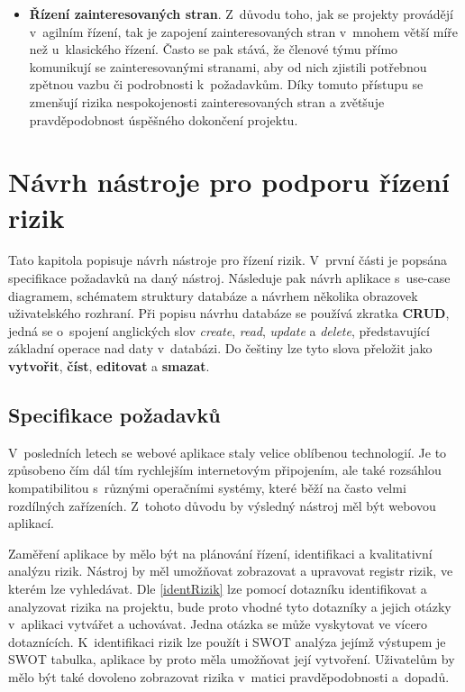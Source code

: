 \begin{itemize}
    \item \textbf{Řízení zainteresovaných stran}. Z~důvodu toho, jak se projekty provádějí v~agilním řízení, tak je zapojení zainteresovaných stran v~mnohem větší míře než u~klasického řízení. Často se pak stává, že členové týmu přímo komunikují se zainteresovanými stranami, aby od nich zjistili potřebnou zpětnou vazbu či podrobnosti k~požadavkům. Díky tomuto přístupu se zmenšují rizika nespokojenosti zainteresovaných stran a zvětšuje pravděpodobnost úspěšného dokončení projektu. 
\end{itemize}


\chapter{Návrh nástroje pro podporu řízení rizik}
\label{navrh}

Tato kapitola popisuje návrh nástroje pro řízení rizik. V~první části je popsána specifikace požadavků na daný nástroj. Následuje pak návrh aplikace s~use-case diagramem, schématem struktury databáze a návrhem několika obrazovek uživatelského rozhraní. Při popisu návrhu databáze se používá zkratka \textbf{CRUD}, jedná se o~spojení anglických slov \textit{create}, \textit{read}, \textit{update} a \textit{delete}, představující základní operace nad daty v~databázi. Do češtiny lze tyto slova přeložit jako \textbf{vytvořit}, \textbf{číst}, \textbf{editovat} a \textbf{smazat}.

\section{Specifikace požadavků}

V~posledních letech se webové aplikace staly velice oblíbenou technologií. Je to způsobeno čím dál tím rychlejším internetovým připojením, ale také rozsáhlou kompatibilitou s~různými operačními systémy, které běží na často velmi rozdílných zařízeních. Z~tohoto důvodu by výsledný nástroj měl být webovou aplikací. 

Zaměření aplikace by mělo být na plánování řízení, identifikaci a kvalitativní analýzu rizik. Nástroj by měl umožňovat zobrazovat a upravovat registr rizik, ve kterém lze vyhledávat. Dle \ref{identRizik} lze pomocí dotazníku identifikovat a analyzovat rizika na projektu, bude proto vhodné tyto dotazníky a jejich otázky v~aplikaci vytvářet a uchovávat. Jedna otázka se může vyskytovat ve vícero dotaznících. K~identifikaci rizik lze použít i SWOT analýza jejímž výstupem je SWOT tabulka, aplikace by proto měla umožňovat její vytvoření. Uživatelům by mělo být také dovoleno zobrazovat rizika v~matici pravděpodobnosti a~dopadů. 

